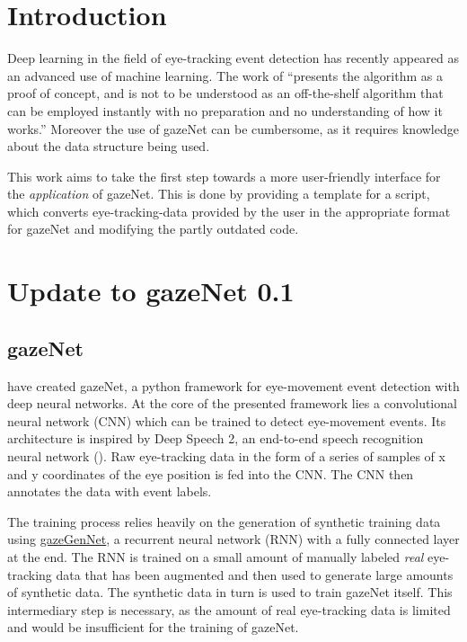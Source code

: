 \documentclass[conference]{IEEEtran}
\begin{document}
\section{Introduction}
Deep learning in the field of eye-tracking event detection has recently appeared as an advanced use of machine learning. The work of \citet*{zemblys2018gazeNet} ``presents the algorithm as a proof of concept, and is not to be understood as an off-the-shelf algorithm that can be employed instantly with no preparation and no understanding of how it works.'' \citet*{zemblys2018gazeNet} Moreover the use of gazeNet can be cumbersome, as it requires knowledge about the data structure being used.

This work aims to take the first step towards a more user-friendly interface for the \emph{application} of gazeNet. This is done by providing a template for a script, which converts eye-tracking-data provided by the user in the appropriate format for gazeNet and modifying the partly outdated code.


\section{Update to gazeNet 0.1}
\subsection{gazeNet}
\cite{zemblys2018gazeNet} have created gazeNet, a python framework for eye-movement event detection with deep neural networks. At the core of the presented framework lies a convolutional neural network (CNN) which can be trained to detect eye-movement events. Its architecture is inspired by Deep Speech 2, an end-to-end speech recognition neural network (\cite{deep_speech_2,zemblys2018gazeNet}). Raw eye-tracking data in the form of a series of samples of x and y coordinates of the eye position is fed into the CNN. The CNN then annotates the data with event labels.

The training process relies heavily on the generation of synthetic training data using \href{https://github.com/r-zemblys/gazeGenNet}{gazeGenNet}, a recurrent neural network (RNN) with a fully connected layer at the end. The RNN is trained on a small amount of manually labeled \emph{real} eye-tracking data that has been augmented \citet{zemblys2018gazeNet} and then used to generate large amounts of synthetic data. The synthetic data in turn is used to train gazeNet itself. This intermediary step is necessary, as the amount of real eye-tracking data is limited and would be insufficient for the training of gazeNet. \cite{zemblys2018gazeNet}
\end{document}
